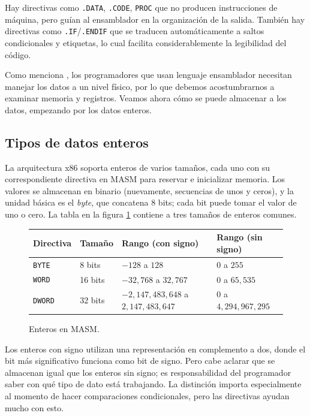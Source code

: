 \documentclass[12pt]{article}
\begin{document}
Hay directivas como \texttt{.DATA}, \texttt{.CODE}, \texttt{PROC} que no
producen instrucciones de máquina, pero guían al ensamblador en la organización
de la salida. También hay directivas como \texttt{.IF}/\texttt{.ENDIF} que se
traducen automáticamente a saltos condicionales y etiquetas, lo cual facilita
considerablemente la legibilidad del código.

Como menciona \textcite{IrvineBook}, los programadores que usan lenguaje
ensamblador necesitan manejar los datos a un nivel físico, por lo que debemos
acostumbrarnos a examinar memoria y registros. Veamos ahora cómo se puede
almacenar a los datos, empezando por los datos enteros.

\subsection{Tipos de datos enteros}

La arquitectura x86 soporta enteros de varios tamaños, cada uno con su
correspondiente directiva en MASM para reservar e inicializar memoria. Los
valores se almacenan en binario (nuevamente, secuencias de unos y ceros), y la
unidad básica es el \textit{byte}, que concatena 8 bits; cada bit puede tomar
el valor de uno o cero. La tabla en la figura \ref{tabla-enteros} contiene a
tres tamaños de enteros comunes.
\begin{figure}[ht]
\centering
  \begin{tabular}{l l l l}
    Directiva & Tamaño & Rango (con signo) & Rango (sin signo) \\
    \hline \hline
    \texttt{BYTE}  & 8 bits  & $-128$ a $128$ & $0$ a $255$ \\ \hline
    \texttt{WORD}  & 16 bits & $-32{,}768$ a $32{,}767$ & $0$ a $65{,}535$ \\ \hline
    \texttt{DWORD} & 32 bits & $-2{,}147{,}483{,}648$ a $2{,}147{,}483{,}647$ &
      $0$ a $4{,}294{,}967{,}295$ \\
  \end{tabular}
\caption{Enteros en MASM.}
\label{tabla-enteros}
\end{figure}

Los enteros con signo utilizan una representación en complemento a dos, donde
el bit más significativo funciona como bit de signo. Pero cabe aclarar que se
almacenan igual que los enteros sin signo; es responsabilidad del programador
saber con qué tipo de dato está trabajando. La distinción importa especialmente
al momento de hacer comparaciones condicionales, pero las directivas ayudan
mucho con esto.
\end{document}

